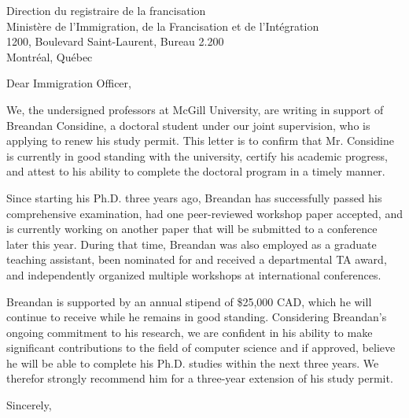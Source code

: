 \documentclass{letter}
\begin{document}
    \begin{letter}{Direction du registraire de la francisation\\
    Minist\`ere de l'Immigration, de la Francisation et de l'Int\'egration\\
    1200, Boulevard Saint-Laurent, Bureau 2.200\\
    Montr\'eal, Qu\'ebec}
        \opening{Dear Immigration Officer,}
\vspace{10pt}
        We, the undersigned professors at McGill University, are writing in support of Breandan Considine, a doctoral student under our joint supervision, who is applying to renew his study permit. This letter is to confirm that Mr. Considine is currently in good standing with the university, certify his academic progress, and attest to his ability to complete the doctoral program in a timely manner.

        Since starting his Ph.D. three years ago, Breandan has successfully passed his comprehensive examination, had one peer-reviewed workshop paper accepted, and is currently working on another paper that will be submitted to a conference later this year. During that time, Breandan was also employed as a graduate teaching assistant, been nominated for and received a departmental TA award, and independently organized multiple workshops at international conferences.

        Breandan is supported by an annual stipend of \$25,000 CAD, which he will continue to receive while he remains in good standing. Considering Breandan's ongoing commitment to his research, we are confident in his ability to make significant contributions to the field of computer science and if approved, believe he will be able to complete his Ph.D. studies within the next three years. We therefor strongly recommend him for a three-year extension of his study permit.
        \vspace{10pt}

        \closing{Sincerely,\\
        \vspace{30pt}
        }
    \end{letter}
\end{document}
